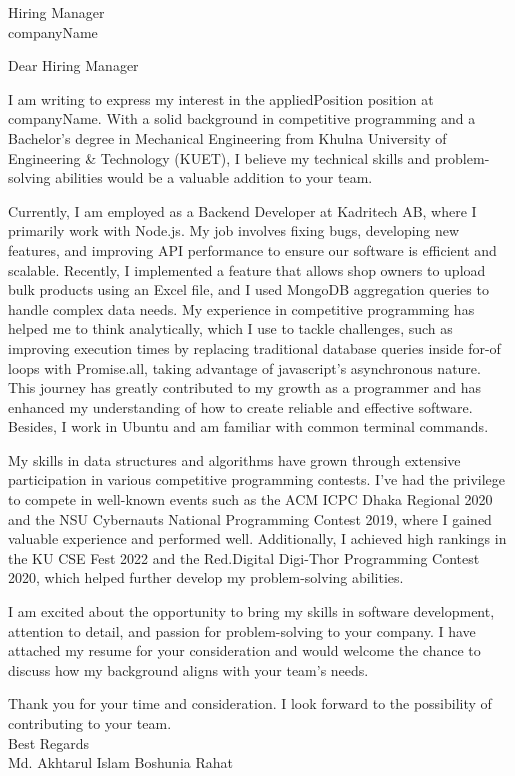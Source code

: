 \documentclass[a4paper,11pt]{letter}
\date{currentDate} %
\begin{document}
\begin{letter}{Hiring Manager \\ companyName}

\opening
{Dear Hiring Manager}

I am writing to express my interest in the appliedPosition position at companyName. With a solid background in competitive programming and a Bachelor’s degree in Mechanical Engineering from Khulna University of Engineering \& Technology (KUET), I believe my technical skills and problem-solving abilities would be a valuable addition to your team.

Currently, I am employed as a Backend Developer at Kadritech AB, where I primarily work with Node.js. My job involves fixing bugs, developing new features, and improving API performance to ensure our software is efficient and scalable. Recently, I implemented a feature that allows shop owners to upload bulk products using an Excel file, and I used MongoDB aggregation queries to handle complex data needs. My experience in competitive programming has helped me to think analytically, which I use to tackle challenges, such as improving execution times by replacing traditional database queries inside for-of loops with Promise.all, taking advantage of javascript's asynchronous nature. This journey has greatly contributed to my growth as a programmer and has enhanced my understanding of how to create reliable and effective software. Besides, I work in Ubuntu and am familiar with common terminal commands.

My skills in data structures and algorithms have grown through extensive participation in various competitive programming contests. I’ve had the privilege to compete in well-known events such as the ACM ICPC Dhaka Regional 2020 and the NSU Cybernauts National Programming Contest 2019, where I gained valuable experience and performed well. Additionally, I achieved high rankings in the KU CSE Fest 2022 and the Red.Digital Digi-Thor Programming Contest 2020, which helped further develop my problem-solving abilities.


I am excited about the opportunity to bring my skills in software development, attention to detail, and passion for problem-solving to your company. I have attached my resume for your consideration and would welcome the chance to discuss how my background aligns with your team’s needs.

Thank you for your time and consideration. I look forward to the possibility of contributing to your team.\\

Best Regards\\
Md. Akhtarul Islam Boshunia Rahat

\end{letter}
\end{document}
